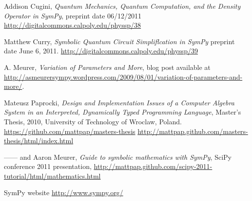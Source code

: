 \documentclass[12pt]{article}
\begin{document}
\begin{thebibliography}{99}

Addison Cugini,
{\it Quantum Mechanics, Quantum Computation, and the Density Operator in SymPy},
preprint date 06/12/2011
\newline
\url{http://digitalcommons.calpoly.edu/physsp/38}

Matthew Curry,
{\it Symbolic Quantum Circuit Simpliflcation in SymPy}
preprint date June 6, 2011.
\newline
\url{http://digitalcommons.calpoly.edu/physsp/39}

 A. Meurer, 
{\it Variation of Parameters and More}, blog post available at
\newline
\url{http://asmeurersympy.wordpress.com/2009/08/01/variation-of-parameters-and-more/}.

Mateusz Paprocki,
{\it  Design and Implementation Issues of a Computer Algebra System 
in an Interpreted, Dynamically Typed Programming Language},
Master's Thesis, 2010, University of Technology of
Wroclaw,  Poland.
\newline
\url{https://github.com/mattpap/masters-thesis}
\newline
\url{http://mattpap.github.com/masters-thesis/html/index.html}

------ and Aaron Meurer,
{\it Guide to symbolic mathematics with SymPy},
SciPy conference 2011 presentation, 
\newline
\url{http://mattpap.github.com/scipy-2011-tutorial/html/mathematics.html}


  SymPy website
\newline
\url{http://www.sympy.org/}



\end{thebibliography}
\end{document}
